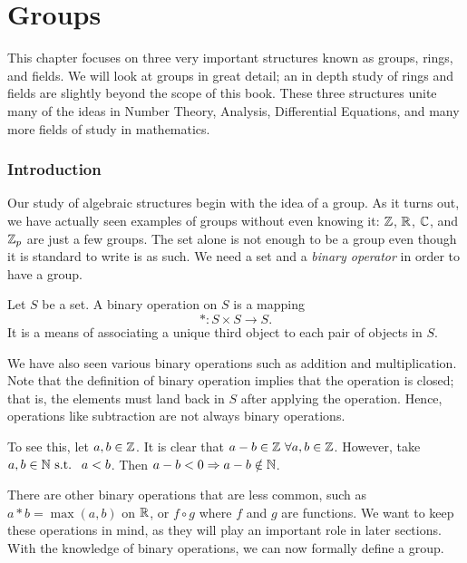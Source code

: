 \chapter{Groups}

This chapter focuses on three very important structures known as groups, rings, and fields. We will look at groups in great detail; an in depth study of rings and fields are slightly beyond the scope of this book. These three structures unite many of the ideas in Number Theory, Analysis, Differential Equations, and many more fields of study in mathematics.

\subsection{Introduction}
Our study of algebraic structures begin with the idea of a group. As it turns out, we have actually seen examples of groups without even knowing it: $\mathbb{Z}$, $\mathbb{R}$, $\mathbb{C}$, and $\mathbb{Z}_{p}$ are just a few groups. The set alone is not enough to be a group even though it is standard to write is as such. We need a set and a \textit{binary operator} in order to have a group.
\begin{definition}{}
	Let $S$ be a set. A binary operation on $S$ is a mapping
	\[*:S\times S \to S.\]
	It is a means of associating a unique third object to each pair of objects in $S$.
\end{definition}
We have also seen various binary operations such as addition and multiplication. Note that the definition of binary operation implies that the operation is closed; that is, the elements must land back in $S$ after applying the operation. Hence, operations like subtraction are not always binary operations.
\begin{example}{}
    To see this, let $a,b\in\mathbb{Z}$. It is clear that $a-b\in\mathbb{Z}\ \forall a,b\in\mathbb{Z}$. However, take $a,b\in\mathbb{N}\text{ s.t. }\ a<b$. Then $a-b<0\Rightarrow a-b\notin \mathbb{N}$.
\end{example}
There are other binary operations that are less common, such as $a*b=\max{(a,b)}$ on $\mathbb{R}$, or $f\circ g$ where $f$ and $g$ are functions. We want to keep these operations in mind, as they will play an important role in later sections. With the knowledge of binary operations, we can now formally define a group.

